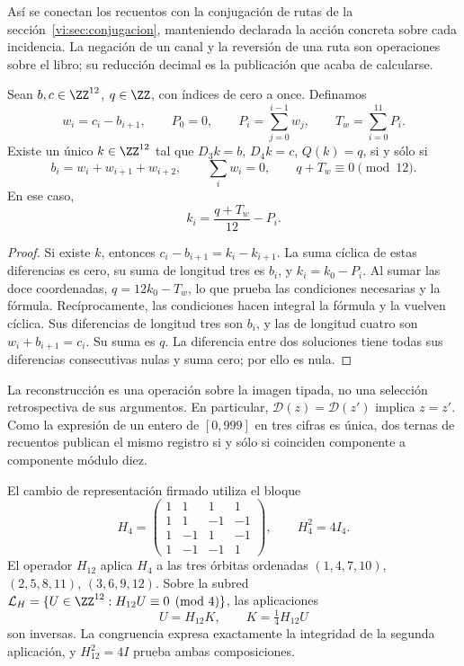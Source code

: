 Así se conectan los recuentos con la conjugación de rutas de la
sección~\ref{vi:sec:conjugacion}, manteniendo declarada la acción
concreta sobre cada incidencia. La negación de un canal y la reversión
de una ruta son operaciones sobre el libro; su reducción decimal es la
publicación que acaba de calcularse.

\begin{proposition}
\label{vi:dep:imagen-integral}
Sean \(b,c\in\ZZ^{12}\), \(q\in\ZZ\), con índices de cero a once.
Definamos
\[
 w_i=c_i-b_{i+1},\qquad P_0=0,\qquad
 P_i=\sum_{j=0}^{i-1}w_j,\qquad T_w=\sum_{i=0}^{11}P_i.
\]
Existe un único \(k\in\ZZ^{12}\) tal que
\(D_3k=b\), \(D_4k=c\), \(Q(k)=q\), si y sólo si
\begin{equation}
 b_i=w_i+w_{i+1}+w_{i+2},\qquad
 \sum_iw_i=0,\qquad q+T_w\equiv0\pmod{12}.
 \label{vi:dep:condiciones-imagen}
\end{equation}
En ese caso,
\begin{equation}
 k_i=\frac{q+T_w}{12}-P_i.
 \label{vi:dep:inversa-incidencial}
\end{equation}
\end{proposition}
\begin{proof}
Si existe \(k\), entonces
\(c_i-b_{i+1}=k_i-k_{i+1}\). La suma cíclica de estas diferencias
es cero, su suma de longitud tres es \(b_i\), y
\(k_i=k_0-P_i\). Al sumar las doce coordenadas,
\(q=12k_0-T_w\), lo que prueba las condiciones necesarias y la fórmula.
Recíprocamente, las condiciones hacen integral la fórmula y la vuelven
cíclica. Sus diferencias de longitud tres son \(b_i\), y las de
longitud cuatro son \(w_i+b_{i+1}=c_i\). Su suma es \(q\).
La diferencia entre dos soluciones tiene todas sus diferencias
consecutivas nulas y suma cero; por ello es nula.
\end{proof}

La reconstrucción es una operación sobre la imagen tipada, no una
selección retrospectiva de sus argumentos. En particular,
\(\mathcal D(z)=\mathcal D(z')\) implica \(z=z'\).
Como la expresión de un entero de \([0,999]\) en tres cifras es única,
dos ternas de recuentos publican el mismo registro si y sólo si coinciden
componente a componente módulo diez.

El cambio de representación firmado utiliza el bloque
\begin{equation}
 H_4=\begin{pmatrix}
 1&1&1&1\\1&1&-1&-1\\
 1&-1&1&-1\\1&-1&-1&1
 \end{pmatrix},\qquad H_4^2=4I_4.
 \label{vi:dep:hadamard}
\end{equation}
El operador \(H_{12}\) aplica \(H_4\) a las tres órbitas ordenadas
\((1,4,7,10)\), \((2,5,8,11)\), \((3,6,9,12)\).
Sobre la subred
\(\mathcal L_H=\{U\in\ZZ^{12}:H_{12}U\equiv0\pmod4\}\),
las aplicaciones
\begin{equation}
 U=H_{12}K,\qquad K=\tfrac14H_{12}U
 \label{vi:dep:K-reversible}
\end{equation}
son inversas. La congruencia expresa exactamente la integridad de la
segunda aplicación, y \(H_{12}^2=4I\) prueba ambas composiciones.

